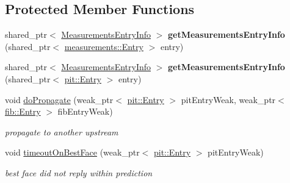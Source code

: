 \subsection*{Protected Member Functions}
\begin{DoxyCompactItemize}
\item 
shared\+\_\+ptr$<$ \hyperlink{classnfd_1_1fw_1_1NccStrategy_1_1MeasurementsEntryInfo}{Measurements\+Entry\+Info} $>$ {\bfseries get\+Measurements\+Entry\+Info} (shared\+\_\+ptr$<$ \hyperlink{classnfd_1_1measurements_1_1Entry}{measurements\+::\+Entry} $>$ entry)\hypertarget{classnfd_1_1fw_1_1NccStrategy_ac1986fcc6f8c4fa0e8ef894812cf8ec8}{}\label{classnfd_1_1fw_1_1NccStrategy_ac1986fcc6f8c4fa0e8ef894812cf8ec8}

\item 
shared\+\_\+ptr$<$ \hyperlink{classnfd_1_1fw_1_1NccStrategy_1_1MeasurementsEntryInfo}{Measurements\+Entry\+Info} $>$ {\bfseries get\+Measurements\+Entry\+Info} (shared\+\_\+ptr$<$ \hyperlink{classnfd_1_1pit_1_1Entry}{pit\+::\+Entry} $>$ entry)\hypertarget{classnfd_1_1fw_1_1NccStrategy_a600c4f2fa588ae14d334e4fbfd8f9c13}{}\label{classnfd_1_1fw_1_1NccStrategy_a600c4f2fa588ae14d334e4fbfd8f9c13}

\item 
void \hyperlink{classnfd_1_1fw_1_1NccStrategy_ad8236933d8510b83295e1274a50ad5c2}{do\+Propagate} (weak\+\_\+ptr$<$ \hyperlink{classnfd_1_1pit_1_1Entry}{pit\+::\+Entry} $>$ pit\+Entry\+Weak, weak\+\_\+ptr$<$ \hyperlink{classnfd_1_1fib_1_1Entry}{fib\+::\+Entry} $>$ fib\+Entry\+Weak)\hypertarget{classnfd_1_1fw_1_1NccStrategy_ad8236933d8510b83295e1274a50ad5c2}{}\label{classnfd_1_1fw_1_1NccStrategy_ad8236933d8510b83295e1274a50ad5c2}

\begin{DoxyCompactList}\small\item\em propagate to another upstream \end{DoxyCompactList}\item 
void \hyperlink{classnfd_1_1fw_1_1NccStrategy_aa0be46b8ee331b10c6cf479077fa61e8}{timeout\+On\+Best\+Face} (weak\+\_\+ptr$<$ \hyperlink{classnfd_1_1pit_1_1Entry}{pit\+::\+Entry} $>$ pit\+Entry\+Weak)\hypertarget{classnfd_1_1fw_1_1NccStrategy_aa0be46b8ee331b10c6cf479077fa61e8}{}\label{classnfd_1_1fw_1_1NccStrategy_aa0be46b8ee331b10c6cf479077fa61e8}

\begin{DoxyCompactList}\small\item\em best face did not reply within prediction \end{DoxyCompactList}\end{DoxyCompactItemize}
